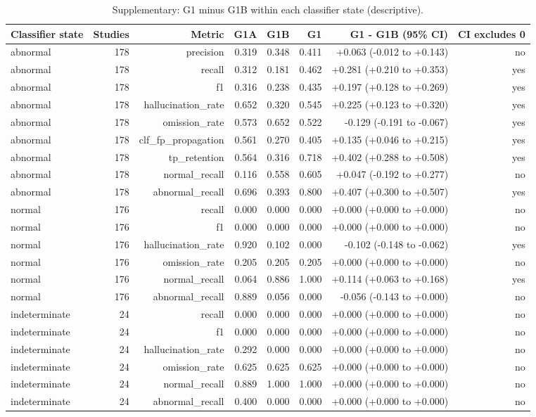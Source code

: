 \begin{table}[t]
\centering
\scriptsize
\begin{tabular}{lrrrrrrr}
\hline
Classifier state & Studies & Metric & G1A & G1B & G1 & G1 - G1B (95\% CI) & CI excludes 0 \\
\hline
abnormal & 178 & precision & 0.319 & 0.348 & 0.411 & +0.063 (-0.012 to +0.143) & no \\
abnormal & 178 & recall & 0.312 & 0.181 & 0.462 & +0.281 (+0.210 to +0.353) & yes \\
abnormal & 178 & f1 & 0.316 & 0.238 & 0.435 & +0.197 (+0.128 to +0.269) & yes \\
abnormal & 178 & hallucination\_rate & 0.652 & 0.320 & 0.545 & +0.225 (+0.123 to +0.320) & yes \\
abnormal & 178 & omission\_rate & 0.573 & 0.652 & 0.522 & -0.129 (-0.191 to -0.067) & yes \\
abnormal & 178 & clf\_fp\_propagation & 0.561 & 0.270 & 0.405 & +0.135 (+0.046 to +0.215) & yes \\
abnormal & 178 & tp\_retention & 0.564 & 0.316 & 0.718 & +0.402 (+0.288 to +0.508) & yes \\
abnormal & 178 & normal\_recall & 0.116 & 0.558 & 0.605 & +0.047 (-0.192 to +0.277) & no \\
abnormal & 178 & abnormal\_recall & 0.696 & 0.393 & 0.800 & +0.407 (+0.300 to +0.507) & yes \\
normal & 176 & recall & 0.000 & 0.000 & 0.000 & +0.000 (+0.000 to +0.000) & no \\
normal & 176 & f1 & 0.000 & 0.000 & 0.000 & +0.000 (+0.000 to +0.000) & no \\
normal & 176 & hallucination\_rate & 0.920 & 0.102 & 0.000 & -0.102 (-0.148 to -0.062) & yes \\
normal & 176 & omission\_rate & 0.205 & 0.205 & 0.205 & +0.000 (+0.000 to +0.000) & no \\
normal & 176 & normal\_recall & 0.064 & 0.886 & 1.000 & +0.114 (+0.063 to +0.168) & yes \\
normal & 176 & abnormal\_recall & 0.889 & 0.056 & 0.000 & -0.056 (-0.143 to +0.000) & no \\
indeterminate & 24 & recall & 0.000 & 0.000 & 0.000 & +0.000 (+0.000 to +0.000) & no \\
indeterminate & 24 & f1 & 0.000 & 0.000 & 0.000 & +0.000 (+0.000 to +0.000) & no \\
indeterminate & 24 & hallucination\_rate & 0.292 & 0.000 & 0.000 & +0.000 (+0.000 to +0.000) & no \\
indeterminate & 24 & omission\_rate & 0.625 & 0.625 & 0.625 & +0.000 (+0.000 to +0.000) & no \\
indeterminate & 24 & normal\_recall & 0.889 & 1.000 & 1.000 & +0.000 (+0.000 to +0.000) & no \\
indeterminate & 24 & abnormal\_recall & 0.400 & 0.000 & 0.000 & +0.000 (+0.000 to +0.000) & no \\
\hline
\end{tabular}
\caption{Supplementary: G1 minus G1B within each classifier state (descriptive).}
\label{tab:table7_supplementary_stratified_by_classifier_state}
\end{table}
